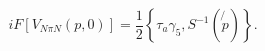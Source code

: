 \begin{equation}
iF[V_{N\pi N}(p,0)]=\frac{1}{2}\left\{ \tau _{a}\gamma _{5},S^{-1}(\not%
{p})\right\} .  \label{iw2}
\end{equation}

